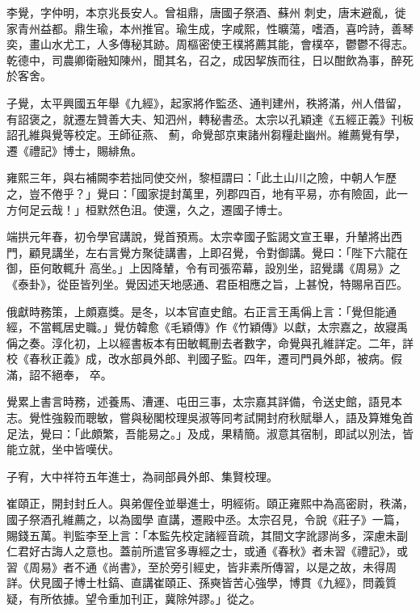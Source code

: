 \begin{pinyinscope}
 李覺，字仲明，本京兆長安人。曾祖鼎，唐國子祭酒、蘇州
 刺史，唐末避亂，徙家青州益都。鼎生瑜，本州推官。瑜生成，字咸熙，性曠蕩，嗜酒，喜吟詩，善琴奕，畫山水尤工，人多傳秘其跡。周樞密使王樸將薦其能，會樸卒，鬱鬱不得志。乾德中，司農卿衛融知陳州，聞其名，召之，成因挈族而往，日以酣飲為事，醉死於客舍。



 子覺，太平興國五年舉《九經》，起家將作監丞、通判建州，秩將滿，州人借留，有詔褒之，就遷左贊善大夫、知泗州，轉秘書丞。太宗以孔穎達《五經正義》刊板詔孔維與覺等校定。王師征燕、
 薊，命覺部京東諸州芻糧赴幽州。維薦覺有學，遷《禮記》博士，賜緋魚。



 雍熙三年，與右補闕李若拙同使交州，黎桓謂曰：「此土山川之險，中朝人乍歷之，豈不倦乎？」覺曰：「國家提封萬里，列郡四百，地有平易，亦有險固，此一方何足云哉！」桓默然色沮。使還，久之，遷國子博士。



 端拱元年春，初令學官講說，覺首預焉。太宗幸國子監謁文宣王畢，升輦將出西門，顧見講坐，左右言覺方聚徒講書，上即召覺，令對御講。覺曰：「陛下六龍在御，臣何敢輒升
 高坐。」上因降輦，令有司張帟幕，設別坐，詔覺講《周易》之《泰卦》，從臣皆列坐。覺因述天地感通、君臣相應之旨，上甚悅，特賜帛百匹。



 俄獻時務策，上頗嘉獎。是冬，以本官直史館。右正言王禹偁上言：「覺但能通經，不當輒居史職。」覺仿韓愈《毛穎傳》作《竹穎傳》以獻，太宗嘉之，故寢禹偁之奏。淳化初，上以經書板本有田敏輒刪去者數字，命覺與孔維詳定。二年，詳校《春秋正義》成，改水部員外郎、判國子監。四年，遷司門員外郎，被病。假滿，詔不絕奉，
 卒。



 覺累上書言時務，述養馬、漕運、屯田三事，太宗嘉其詳備，令送史館，語見本志。覺性強毅而聰敏，嘗與秘閣校理吳淑等同考試開封府秋賦舉人，語及算雉兔首足法，覺曰：「此頗繁，吾能易之。」及成，果精簡。淑意其宿制，即試以別法，皆能立就，坐中皆嘆伏。



 子宥，大中祥符五年進士，為祠部員外郎、集賢校理。



 崔頤正，開封封丘人。與弟偓佺並舉進士，明經術。頤正雍熙中為高密尉，秩滿，國子祭酒孔維薦之，以為國學
 直講，遷殿中丞。太宗召見，令說《莊子》一篇，賜錢五萬。判監李至上言：「本監先校定諸經音疏，其間文字訛謬尚多，深慮未副仁君好古誨人之意也。蓋前所遣官多專經之士，或通《春秋》者未習《禮記》，或習《周易》者不通《尚書》，至於旁引經史，皆非素所傳習，以是之故，未得周詳。伏見國子博士杜鎬、直講崔頤正、孫奭皆苦心強學，博貫《九經》，問義質疑，有所依據。望令重加刊正，冀除舛謬。」從之。




\end{pinyinscope}

